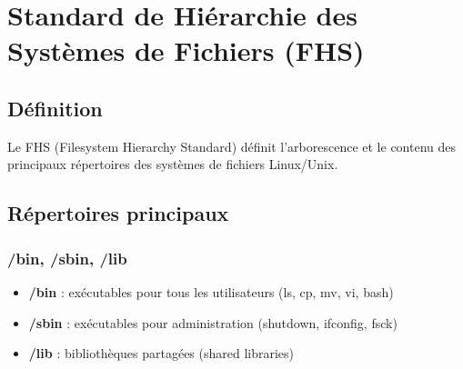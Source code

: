 \documentclass[12pt,a4paper]{article}
\begin{document}
\section{Standard de Hi\'erarchie des Syst\`emes de Fichiers (FHS)}


\subsection{D\'efinition}
Le FHS (Filesystem Hierarchy Standard) d\'efinit l'arborescence et le contenu des principaux r\'epertoires des syst\`emes de fichiers Linux/Unix.

\subsection{R\'epertoires principaux}


\subsubsection{/bin, /sbin, /lib}
\begin{itemize}
    \item \textbf{/bin} : ex\'ecutables pour tous les utilisateurs (ls, cp, mv, vi, bash) %
    \item \textbf{/sbin} : ex\'ecutables pour administration (shutdown, ifconfig, fsck) %
    \item \textbf{/lib} : biblioth\`eques partag\'ees (shared libraries) %
\end{itemize}
\end{document}
